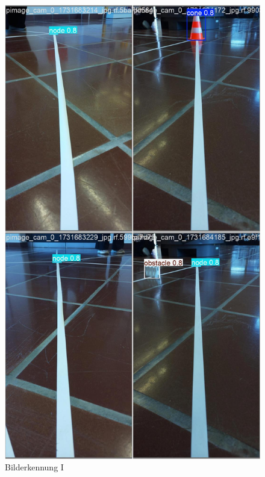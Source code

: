\begin{figure}[H]
  \centering
   \begin{minipage}[b]{0.28\textwidth}
    \centering
    \includegraphics[width=\textwidth]{assets/IT/yolo/val_batch0_pred.jpg}
    \caption{Bilderkennung I}
    \label{fig:yolo-i}
  \end{minipage}
  \hfill
  \begin{minipage}[b]{0.28\textwidth}
    \centering

\end{minipage}
\end{figure}
